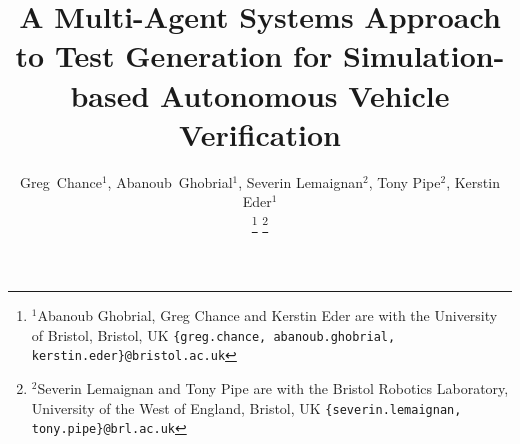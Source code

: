 \documentclass[letterpaper, 10 pt, journal, twoside]{IEEEtran}
\begin{document}
\title{A Multi-Agent Systems Approach to Test Generation for Simulation-based Autonomous Vehicle Verification}
\author{Greg~Chance$^{1}$, 
Abanoub~Ghobrial$^{1}$, 
Severin Lemaignan$^{2}$,
Tony Pipe$^{2}$,
Kerstin Eder$^{1}$%


\thanks{$^{1}$Abanoub Ghobrial, Greg Chance and Kerstin Eder are with the University of Bristol, Bristol, UK {\tt\footnotesize \{greg.chance, abanoub.ghobrial, kerstin.eder\}@bristol.ac.uk}}%
\thanks{$^{2}$Severin Lemaignan and Tony Pipe are with the Bristol Robotics Laboratory, University of the West of England, Bristol, UK {\tt\footnotesize \{severin.lemaignan, tony.pipe\}@brl.ac.uk}}%
}
\maketitle
\end{document}

